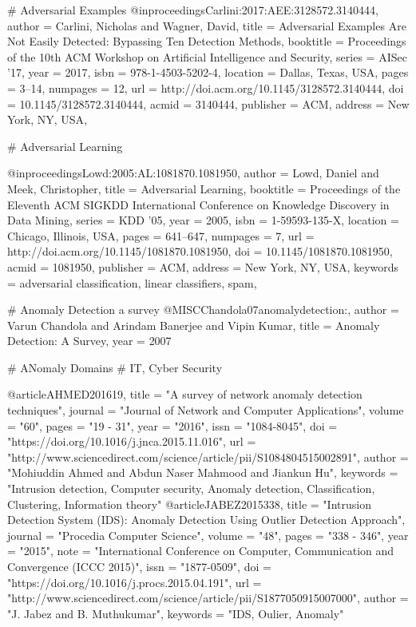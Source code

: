 # Adversarial Examples
@inproceedings{Carlini:2017:AEE:3128572.3140444,
 author = {Carlini, Nicholas and Wagner, David},
 title = {Adversarial Examples Are Not Easily Detected: Bypassing Ten Detection Methods},
 booktitle = {Proceedings of the 10th ACM Workshop on Artificial Intelligence and Security},
 series = {AISec '17},
 year = {2017},
 isbn = {978-1-4503-5202-4},
 location = {Dallas, Texas, USA},
 pages = {3--14},
 numpages = {12},
 url = {http://doi.acm.org/10.1145/3128572.3140444},
 doi = {10.1145/3128572.3140444},
 acmid = {3140444},
 publisher = {ACM},
 address = {New York, NY, USA},
}

# Adversarial Learning

@inproceedings{Lowd:2005:AL:1081870.1081950,
 author = {Lowd, Daniel and Meek, Christopher},
 title = {Adversarial Learning},
 booktitle = {Proceedings of the Eleventh ACM SIGKDD International Conference on Knowledge Discovery in Data Mining},
 series = {KDD '05},
 year = {2005},
 isbn = {1-59593-135-X},
 location = {Chicago, Illinois, USA},
 pages = {641--647},
 numpages = {7},
 url = {http://doi.acm.org/10.1145/1081870.1081950},
 doi = {10.1145/1081870.1081950},
 acmid = {1081950},
 publisher = {ACM},
 address = {New York, NY, USA},
 keywords = {adversarial classification, linear classifiers, spam},
}

# Anomaly Detection a survey
@MISC{Chandola07anomalydetection:,
    author = {Varun Chandola and Arindam Banerjee and Vipin Kumar},
    title = {Anomaly Detection: A Survey},
    year = {2007}
}

# ANomaly Domains
# IT, Cyber Security

@article{AHMED201619,
title = "A survey of network anomaly detection techniques",
journal = "Journal of Network and Computer Applications",
volume = "60",
pages = "19 - 31",
year = "2016",
issn = "1084-8045",
doi = "https://doi.org/10.1016/j.jnca.2015.11.016",
url = "http://www.sciencedirect.com/science/article/pii/S1084804515002891",
author = "Mohiuddin Ahmed and Abdun Naser Mahmood and Jiankun Hu",
keywords = "Intrusion detection, Computer security, Anomaly detection, Classification, Clustering, Information theory"
}
@article{JABEZ2015338,
title = "Intrusion Detection System (IDS): Anomaly Detection Using Outlier Detection Approach",
journal = "Procedia Computer Science",
volume = "48",
pages = "338 - 346",
year = "2015",
note = "International Conference on Computer, Communication and Convergence (ICCC 2015)",
issn = "1877-0509",
doi = "https://doi.org/10.1016/j.procs.2015.04.191",
url = "http://www.sciencedirect.com/science/article/pii/S1877050915007000",
author = "J. Jabez and B. Muthukumar",
keywords = "IDS, Oulier, Anomaly"
}

